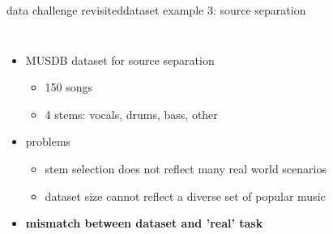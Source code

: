 \begin{frame}{data challenge revisited}{dataset example 3: source separation}
    \vspace{-5mm}
    \begin{columns}
    \begin{itemize}
        \item	MUSDB dataset for source separation
            \begin{itemize}
                \item   150 songs
                \item   4 stems: vocals, drums, bass, other
            \end{itemize}
        \bigskip
        \item<2->	problems
            \begin{itemize}
                \item   stem selection does not reflect many real world scenarios
                \item   dataset size cannot reflect a diverse set of popular music
            \end{itemize}
        \bigskip
        \item<3->[$\Rightarrow$] \textbf{mismatch between dataset and 'real' task}
    \end{itemize}
    \end{columns}
\end{frame}

